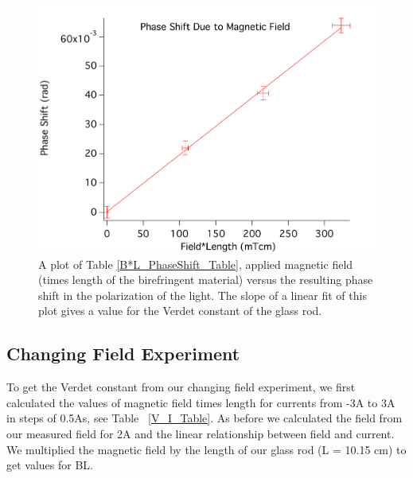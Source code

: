 \documentclass[prb,preprint]{revtex4-1}
\begin{document}
\begin{figure}[h!]
\centering
\includegraphics[width=5in]{PhaseShift_B-L_Plot.pdf}
\caption{A plot of Table \ref{B*L_PhaseShift_Table}, applied magnetic field (times length of the birefringent material) versus the resulting phase shift in the polarization of the light. The slope of a linear fit of this plot gives a value for the Verdet constant of the glass rod. }
\label{PhaseShift_B*L_Plot}
\end{figure}


\subsection{Changing Field Experiment}

To get the Verdet constant from our changing field experiment, we first calculated the values of magnetic field times length for currents from -3A to 3A in steps of 0.5As, see Table ~\ref{V_I_Table}. As before we calculated the field from our measured field for 2A and the linear relationship between field and current. We multiplied the magnetic field by the length of our glass rod (L = 10.15 cm) to get values for BL. 
\end{document}
